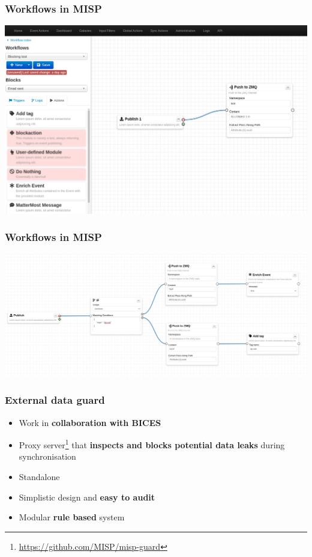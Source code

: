 \begin{frame}
\frametitle{Workflows in MISP}
\includegraphics[scale=0.2]{images/workflows1.png}
\end{frame}

\begin{frame}
\frametitle{Workflows in MISP}
\includegraphics[scale=0.2]{images/workflows2.png}
\end{frame}


\begin{frame}
  \frametitle{External data guard}
  \begin{itemize}
     \item Work in {\bf collaboration with BICES}
     \item Proxy server\footnote{\url{https://github.com/MISP/misp-guard}} that {\bf inspects and blocks potential data leaks} during synchronisation
     \item Standalone
     \item Simplistic design and {\bf easy to audit}
     \item Modular {\bf rule based} system
  \end{itemize}
\end{frame}

